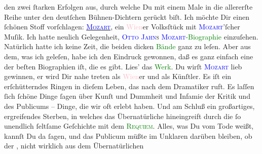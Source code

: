                den zwei ſtarken Erfolgen aus, durch welche Du mit einem {\pb}Male in die allererſte Reihe unter den deutſchen
               Bühnen-Dichtern gerückt biſt. Ich möchte Dir einen ſchönen Stoff vorſchlagen: \uline{\textsc{\textcolor{blue}{Mozart}{}\ledrightnote{\textcolor{blue}{Wolfgang Amadeus Mozart}}}}, ein \textcolor{pink}{Wien}{}\ledrightnote{\textcolor{pink}{Wien}}er Volksſtück mit \textsc{\textcolor{blue}{Mozart}{}\ledrightnote{\textcolor{blue}{Wolfgang Amadeus Mozart}}}’ſcher Muſik. Ich hatte neulich Gelegenheit, \textsc{\textcolor{blue}{Otto Jahn}{}\ledrightnote{\textcolor{blue}{Otto Jahn}}s}{ }\textcolor{green}{\textsc{\textcolor{blue}{Mozart}{}\ledrightnote{\textcolor{blue}{Wolfgang Amadeus Mozart}}}-Biographie}{} einzuſehen. Natürlich hatte ich keine Zeit, die beiden
               dicken \textcolor{green}{Bände}{} ganz zu leſen.
               Aber aus dem, was ich geleſen, habe ich den Eindruck gewonnen, daß es ganz einfach
               eine der beſten Biographien iſt, die es gibt. Lies’ das \textcolor{green}{Werk}{}. Du wirſt \textsc{\textcolor{blue}{Mozart}{}\ledrightnote{\textcolor{blue}{Wolfgang Amadeus Mozart}}}{ }{\pb}lieb gewinnen, er wird Dir nahe treten als \textcolor{pink}{Wien}{}\ledrightnote{\textcolor{pink}{Wien}}er\strikeout{,}{ } und als Künſtler. Es iſt ein erſchütterndes
               Ringen in dieſem Leben, das nach dem Dramatiker ruft. Es laſſen ſich ſchöne Dinge
               ſagen über Kunſt und Dummheit und Infamie der Kritik und des Publicums – Dinge, die
               wir oft erlebt haben. Und am Schluß ein großartiges, ergreifendes Sterben, in welches
               das Übernatürliche hineingreift durch die ſo unendlich ſeltſame Geſchichte mit dem
                  \textsc{\textcolor{green}{Requiem}{}\ledrightnote{\textcolor{green}{Requiem d-Moll KV 626}}}. Alles, was Du vom Tode weißt, {\pb}kannſt Du da
               ſagen, und das Publicum  müßte im Unklaren darüben bleiben, ob der \label{K_L02790-123v}\label{K_L02790-123h}, nicht wirklich aus dem Übernatürlichen
